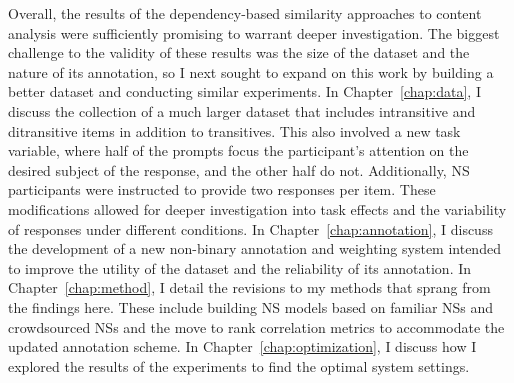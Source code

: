 Overall, the results of the dependency-based similarity approaches to content analysis were sufficiently promising to warrant deeper investigation. The biggest challenge to the validity of these results was the size of the dataset and the nature of its annotation, so I next sought to expand on this work by building a better dataset and conducting similar experiments. In Chapter~\ref{chap:data}, I discuss the collection of a much larger dataset that includes intransitive and ditransitive items in addition to transitives. This also involved a new task variable, where half of the prompts focus the participant's attention on the desired subject of the response, and the other half do not. Additionally, NS participants were instructed to provide two responses per item. These modifications allowed for deeper investigation into task effects and the variability of responses under different conditions. In Chapter~\ref{chap:annotation}, I discuss the development of a new non-binary annotation and weighting system intended to improve the utility of the dataset and the reliability of its annotation. In Chapter~\ref{chap:method}, I detail the revisions to my methods that sprang from the findings here. These include building NS models based on familiar NSs and crowdsourced NSs and the move to rank correlation metrics to accommodate the updated annotation scheme. In Chapter~\ref{chap:optimization}, I discuss how I explored the results of the experiments to find the optimal system settings.

